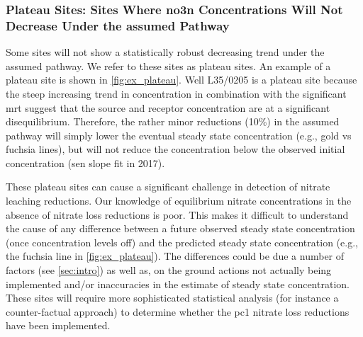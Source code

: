 \subsubsection[Plateau Sites]{Plateau Sites: Sites Where \gls{no3n} Concentrations Will Not Decrease Under the assumed Pathway} \label{sec:plateau_results}



Some sites will not show a statistically robust decreasing trend under the assumed pathway.
We refer to these sites as plateau sites. An example of a plateau site is shown in \autoref{fig:ex_plateau}.
Well L35/0205 is a plateau site because the steep increasing trend in concentration in combination with the significant \gls{mrt} suggest that the source and receptor concentration are at a significant disequilibrium.
Therefore, the rather minor reductions (10\%) in the assumed pathway will simply lower the eventual steady state concentration (e.g., gold vs fuchsia lines), but will not reduce the concentration below the observed initial concentration (sen slope fit in 2017).


These plateau sites can cause a significant challenge in detection of nitrate leaching reductions.
Our knowledge of equilibrium nitrate concentrations in the absence of nitrate loss reductions is poor.
This makes it difficult to understand the cause of any difference between a future observed steady state concentration (once concentration levels off) and the predicted steady state concentration (e.g., the fuchsia line in \autoref{fig:ex_plateau}).
The differences could be due a number of factors (see \autoref{sec:intro}) as well as, on the ground actions not actually being implemented and/or inaccuracies in the estimate of steady state concentration.
These sites will require more sophisticated statistical analysis (for instance a counter-factual approach) to determine whether the \gls{pc1} nitrate loss reductions have been implemented.

